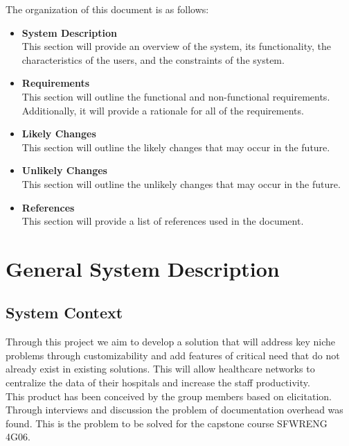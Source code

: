 \documentclass[12pt]{article}
\begin{document}
The organization of this document is as follows:
\begin{itemize}
  \item \textbf{System Description}\\
  This section will provide an overview of the system, its functionality, the characteristics of the users, and the constraints of the system.
  \item \textbf{Requirements}\\
  This section will outline the functional and non-functional requirements. Additionally, it will provide a rationale for all of the requirements.
  \item \textbf{Likely Changes}\\
  This section will outline the likely changes that may occur in the future.
  \item \textbf{Unlikely Changes}\\
  This section will outline the unlikely changes that may occur in the future.
  \item \textbf{References}\\
  This section will provide a list of references used in the document.
\end{itemize}

\section{General System Description} \label{sec_GeneralSystemDescription}

\subsection{System Context} \label{sec_SystemContext}

Through this project we aim to develop a solution that will address key niche problems through customizability and add features of critical need that do not already exist in existing solutions. This will allow healthcare networks to centralize the data of their hospitals and increase the staff productivity.\\

\noindent This product has been conceived by the group members based on elicitation. Through interviews and discussion the problem of documentation overhead was found. This is the problem to be solved for the capstone course SFWRENG 4G06.
\end{document}
